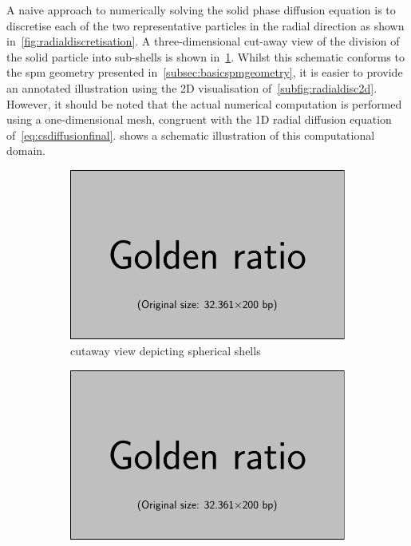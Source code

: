 A  naive approach  to numerically  solving  the solid  phase diffusion  equation
is  to  discretise each  of  the  two  representative  particles in  the  radial
direction  as  shown   in~\cref{fig:radialdiscretisation}.  A  three-dimensional
cut-away view  of the division  of the solid  particle into sub-shells  is shown
in~\cref{subfig:radialdisc3d}. Whilst  this schematic conforms to  the \gls{spm}
geometry presented in~\cref{subsec:basicspmgeometry}, it is easier to provide an
annotated illustration using the 2D visualisation of~\cref{subfig:radialdisc2d}.
However, it should  be noted that the actual numerical  computation is performed
using a  one-dimensional mesh, congruent  with the 1D radial  diffusion equation
of~\cref{eq:csdiffusionfinal}.     shows  a  schematic
illustration of this computational domain.
\begin{figure}[h]
    \centering
    \begin{subfigure}[b]{0.3\textwidth}
        \centering
        \includegraphics{placeholder_images/example-image-golden.pdf}
        \caption{cutaway view depicting spherical shells}
        \label{subfig:radialdisc3d}
    \end{subfigure}
    \hfill
    \begin{subfigure}[b]{0.3\textwidth}
        \centering
        \includegraphics{placeholder_images/example-image-golden.pdf}

\end{subfigure}
\end{figure}
